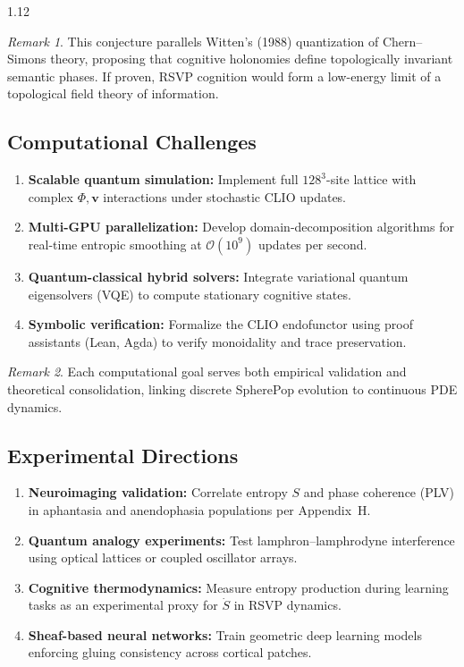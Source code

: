 \documentclass[12pt,a4paper]{article}
\numberwithin{equation}{section}
\theoremstyle{remark}
\newtheorem{remark}{Remark}[section]
\theoremstyle{definition}
\begin{document}
\begin{spacing}{1.12}
\begin{remark}
This conjecture parallels Witten’s (1988) quantization of Chern–Simons theory, proposing that cognitive holonomies define topologically invariant semantic phases.  
If proven, RSVP cognition would form a low-energy limit of a topological field theory of information.
\end{remark}

\subsection{Computational Challenges}\label{sec:I-comp}

\begin{enumerate}[label=\textbf{C\arabic*.}]
\item \textbf{Scalable quantum simulation:} Implement full $128^3$-site lattice with complex $\Phi,\mathbf{v}$ interactions under stochastic CLIO updates.
\item \textbf{Multi-GPU parallelization:} Develop domain-decomposition algorithms for real-time entropic smoothing at $\mathcal{O}(10^9)$ updates per second.
\item \textbf{Quantum-classical hybrid solvers:} Integrate variational quantum eigensolvers (VQE) to compute stationary cognitive states.
\item \textbf{Symbolic verification:} Formalize the CLIO endofunctor using proof assistants (Lean, Agda) to verify monoidality and trace preservation.
\end{enumerate}

\begin{remark}
Each computational goal serves both empirical validation and theoretical consolidation, linking discrete SpherePop evolution to continuous PDE dynamics.
\end{remark}

\subsection{Experimental Directions}\label{sec:I-exp}

\begin{enumerate}[label=\textbf{E\arabic*.}]
\item \textbf{Neuroimaging validation:} Correlate entropy $S$ and phase coherence (PLV) in aphantasia and anendophasia populations per Appendix~H.
\item \textbf{Quantum analogy experiments:} Test lamphron–lamphrodyne interference using optical lattices or coupled oscillator arrays.
\item \textbf{Cognitive thermodynamics:} Measure entropy production during learning tasks as an experimental proxy for $\dot{S}$ in RSVP dynamics.
\item \textbf{Sheaf-based neural networks:} Train geometric deep learning models enforcing gluing consistency across cortical patches.
\end{enumerate}


\end{spacing}
\end{document}
